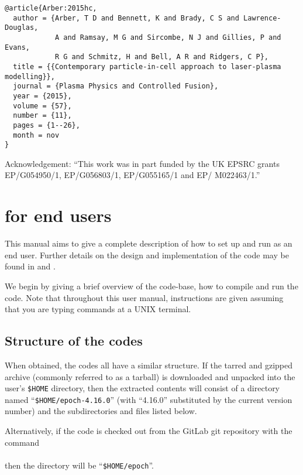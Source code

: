 \begin{verbatim}
@article{Arber:2015hc,
  author = {Arber, T D and Bennett, K and Brady, C S and Lawrence-Douglas,
            A and Ramsay, M G and Sircombe, N J and Gillies, P and Evans,
            R G and Schmitz, H and Bell, A R and Ridgers, C P},
  title = {{Contemporary particle-in-cell approach to laser-plasma modelling}},
  journal = {Plasma Physics and Controlled Fusion},
  year = {2015},
  volume = {57},
  number = {11},
  pages = {1--26},
  month = nov
}
\end{verbatim}

Acknowledgement: ``This work was in part funded by the UK EPSRC grants
EP/G054950/1, EP/G056803/1, EP/G055165/1 and EP/ M022463/1.''

\newpage
\section{\texorpdfstring
  {{\EPOCH} for end users}
  {{EPOCH} for end users}}
\label{sec:endusers}
This manual aims to give a complete description of how to set up and run
{\EPOCH} as an end user. Further details on the design and implementation of
the code may be found in \citet{Arber} and \citet{Ridgers}.

We begin by giving a brief overview of the {\EPOCH} code-base, how to
compile and run the code. Note that throughout this user manual, instructions
are given assuming that you are typing commands at a UNIX terminal.

\subsection{\texorpdfstring
  {Structure of the {\EPOCH} codes}
  {Structure of the {EPOCH} codes}}
\label{sec:directory_structure}
When obtained, the {\EPOCH} codes all have a similar structure. If the tarred
and gzipped archive (commonly referred to as a tarball) is downloaded and
unpacked into the user's \verb|$HOME| directory, then the extracted contents
will consist of a directory named ``\verb|$HOME/epoch-4.16.0|''
(with ``4.16.0'' substituted by the current version number) and the
subdirectories and files listed below.

Alternatively, if the code is checked out from the GitLab git
repository with the command\\
\indent{}\\
\noindent%
then the directory will be ``\verb|$HOME/epoch|''.

